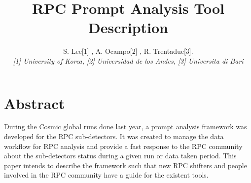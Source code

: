 \documentclass[11pt]{amsart}
\title{RPC Prompt Analysis Tool Description}
\author{ S. Lee[1] , A. Ocampo[2] , R. Trentadue[3].\\ \textit{[1] University of Korea, [2] Universidad de los Andes, [3] Universita di Bari} }
\begin{document}
\maketitle

\section{Abstract}
During the Cosmic global runs done last year, a prompt analysis framework was developed for the RPC sub-detectors. It was created to manage the data workflow for RPC analysis and provide a fast response to the RPC community about the sub-detectors status during a given run or data taken period. This paper intends to describe the framework such that new RPC shifters and people involved in the RPC community have a guide for the existent tools. 
\newpage
\end{document}
